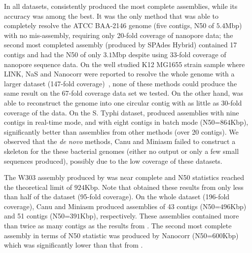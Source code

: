 In all datasets, \npscarf{} consistently
produced the most complete assemblies, while its accuracy was among the best.
It was the only method that was able to completely resolve the \kp{} ATCC BAA-2146
genome (five contigs, N50 of $5.4$Mbp) with no mis-assembly, requiring only
20-fold coverage of nanopore data; the second most completed assembly 
(produced by SPAdes Hybrid) contained 17 contigs and had the N50 of 
only $3.1$Mbp despite using 33-fold coverage of nanopore sequence data.
On the well studied \ec{} K12 MG1655 strain
sample where LINK, NaS and Nanocorr were reported to resolve the whole genome
with a larger dataset (147-fold coverage)~\cite{WarrenYV2015}, 
none of these methods could produce the same result on the 67-fold coverage data
set we tested. On the other hand, \npscarf{} was able to reconstruct the genome
into one circular contig with as little as 30-fold coverage of the 
data. On the S. Typhi dataset, \npscarf{} produced assemblies with nine contigs
in real-time mode, and with eight contigs in batch mode (N50=$864$Kbp),
significantly better than assemblies from other methods (over 20 contigs).
We observed that the \emph{de novo} methods, Canu and Miniasm failed to
construct a skeleton for the these bacterial genomes (either no output or only 
a few small sequences produced), possibly due to the low coverage of these
datasets.


The \sce{} W303 assembly produced by \npscarf{} was near complete and N50
statistics reached the theoretical limit of $924$Kbp. Note that \npscarf{} obtained
these results from only less than half of the dataset (95-fold coverage). On
the whole dataset (196-fold coverage), Canu and Miniasm produced assemblies of
43 contigs (N50=$496$Kbp) and 51 contigs (N50=$391$Kbp), respectively. These
assemblies contained more than twice as many contigs as the results from
\npscarf{}. The second most complete assembly in terms of N50 statistic was
produced by Nanocorr (N50=$600$Kbp) which was significantly lower than that from
\npscarf{}.


